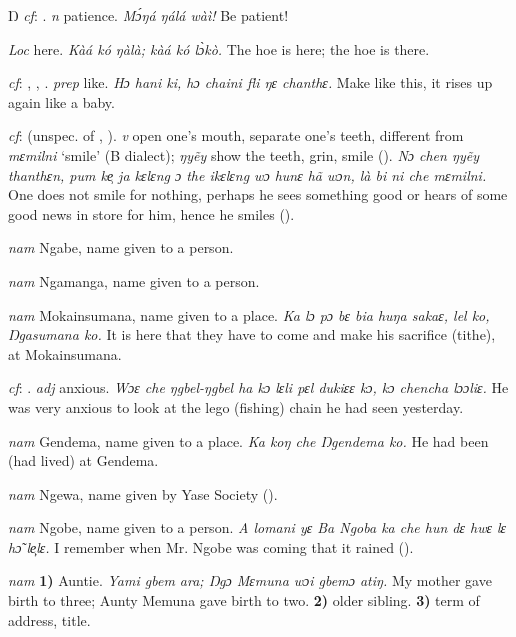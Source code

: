 \begin{letter}{Ŋ}
 \textit{cf}: . \textit{n} patience. \textit{Mɔ́ŋá ŋálá wàì!} Be patient!

 \textit{Loc} here. \textit{Kàá kó ŋàlà; kàá kó lɔ̀kò.} The hoe is here; the hoe is there.

 \textit{cf}: , , . \textit{prep} like. \textit{Hɔ hani ki, hɔ chaini fli ŋɛ chanthɛ.} Make like this, it rises up again like a baby.

 \textit{cf}:  (unspec. of , ). \textit{v} open one's mouth, separate one's teeth, different from \textit{mɛmilni} ‘smile' (B dialect); \textit{ŋyẽy} show the teeth, grin, smile (\citealt{Pichl1967}). \textit{Nɔ chen ŋyẽy thanthɛn, pum ke̹ ja kɛlɛng ɔ the ikɛlɛng wɔ hunɛ hã wɔn, là bi ni che mɛmilni.} One does not smile for nothing, perhaps he sees something good or hears of some good news in store for him, hence he smiles (\citealt{Pichl1967}). 

 \textit{nam} Ngabe, name given to a person.

 \textit{nam} Ngamanga, name given to a person.

 \textit{nam} Mokainsumana, name given to a place. \textit{Ka lɔ pɔ bɛ bia huŋa sakaɛ, lel ko, Ŋgasumana ko.} It is here that they have to come and make his sacrifice (tithe), at Mokainsumana.

 \textit{cf}: . \textit{adj} anxious. \textit{Wɔɛ che ŋgbel-ŋgbel ha kɔ lɛli pɛl dukiɛɛ kɔ, kɔ chencha lɔɔliɛ.} He was very anxious to look at the lego (fishing) chain he had seen yesterday.

 \textit{nam} Gendema, name given to a place. \textit{Ka koŋ che Ŋgendema ko.} He had been (had lived) at Gendema.

 \textit{nam} Ngewa, name given by Yase Society (\citealt{Pichl1967}). 

 \textit{nam} Ngobe, name given to a person. \textit{A lomani yɛ Ba Ngoba ka che hun dɛ hwɛ lɛ hɔ̃ le̹l̦ɛ.} I remember when Mr. Ngobe was coming that it rained (\citealt{Pichl1967}).

 \textit{nam} \textbf{1)} Auntie. \textit{Yami gbem ara; Ŋgɔ Mɛmuna wɔi gbemɔ atiŋ.} My mother gave birth to three; Aunty Memuna gave birth to two. \textbf{2)} older sibling. \textbf{3)} term of address, title.


\end{letter}
